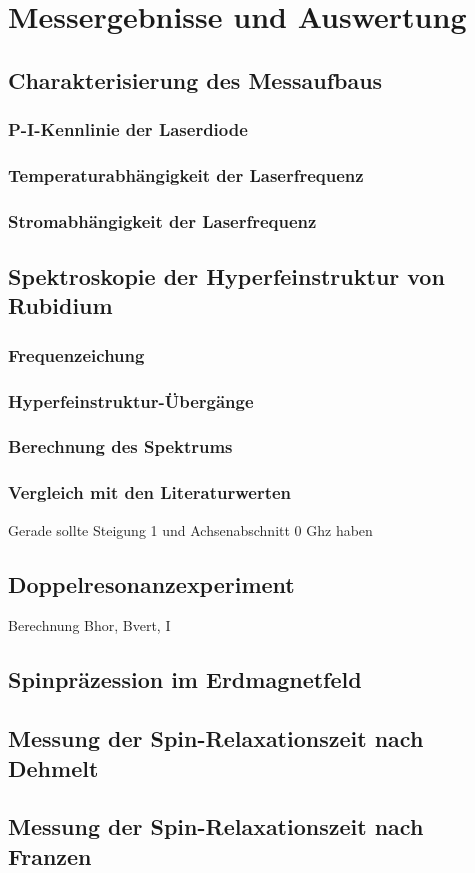 \section{Messergebnisse und Auswertung}
\subsection{Charakterisierung des Messaufbaus}

\subsubsection*{P-I-Kennlinie der Laserdiode}

\subsubsection*{Temperaturabhängigkeit der Laserfrequenz}

\subsubsection*{Stromabhängigkeit der Laserfrequenz} 

\subsection{Spektroskopie der Hyperfeinstruktur von Rubidium}
\subsubsection*{Frequenzeichung}
\subsubsection*{Hyperfeinstruktur-Übergänge}
\subsubsection*{Berechnung des Spektrums}
\subsubsection*{Vergleich mit den Literaturwerten}
Gerade sollte Steigung 1 und Achsenabschnitt 0 Ghz haben

\subsection{Doppelresonanzexperiment}
Berechnung Bhor, Bvert, I

\subsection{Spinpräzession im Erdmagnetfeld}


\subsection{Messung der Spin-Relaxationszeit nach Dehmelt}


\subsection{Messung der Spin-Relaxationszeit nach Franzen}